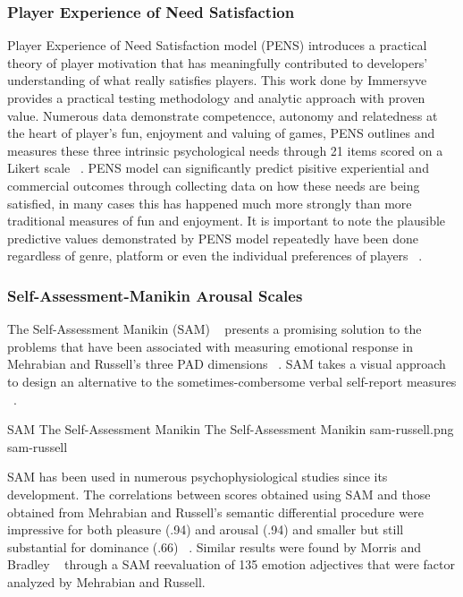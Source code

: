 \subsubsection{Player Experience of Need Satisfaction}
Player Experience of Need Satisfaction model (PENS) introduces a practical theory of player motivation that has meaningfully contributed to developers' understanding of what really satisfies players. This work done by Immersyve ~\cite{rigby2007pens} provides a practical testing methodology and analytic approach with proven value. Numerous data demonstrate competencce, autonomy and relatedness at the heart of player's fun, enjoyment and valuing of games, PENS outlines and measures these three intrinsic psychological needs through 21 items scored on a Likert scale ~\cite{rigby2007pens}. PENS model can significantly predict pisitive experiential and commercial outcomes through collecting data on how these needs are being satisfied, in many cases this has happened much more strongly than more traditional measures of fun and enjoyment. It is important to note the plausible predictive values demonstrated by PENS model repeatedly have been done regardless of genre, platform or even the individual preferences of players ~\cite{rigby2007pens}.

\subsubsection{Self-Assessment-Manikin Arousal Scales}
The Self-Assessment Manikin (SAM) ~\cite{lang1985cognitive} presents a promising solution to the problems that have been associated with measuring emotional response in Mehrabian and Russell's three PAD dimensions ~\cite{russell1977evidence}. SAM takes a visual approach to design an alternative to the sometimes-combersome verbal self-report measures ~\cite{lang1985cognitive}.

\img
{SAM The Self-Assessment Manikin}
{The Self-Assessment Manikin}
{sam-russell.png}
{sam-russell}

SAM has been used in numerous psychophysiological studies since its development. The correlations between scores obtained using SAM and those obtained from Mehrabian and Russell's semantic differential procedure were impressive for both pleasure (.94) and arousal (.94) and smaller but still substantial for dominance (.66) ~\cite{lang1985cognitive}. Similar results were found by Morris and Bradley ~\cite{morris1995observations} through a SAM reevaluation of 135 emotion adjectives that were factor analyzed by Mehrabian and Russell.

